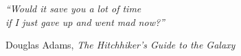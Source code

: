 \null\vspace{5cm}%
\begin{flushright}

\textit{``Would it save you a lot of time\\
if I just gave up and went mad now?''}

\bigskip
\small Douglas Adams, 
\textit{The Hitchhiker's Guide to the Galaxy}
\end{flushright}
\cleardoublepage

